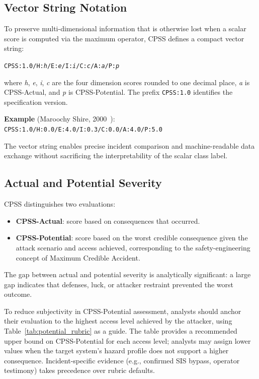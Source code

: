 \documentclass[11pt]{article}
\begin{document}
\subsection{Vector String Notation}

To preserve multi-dimensional information that is otherwise lost
when a scalar score is computed via the maximum operator,
CPSS defines a compact vector string:

\begin{center}
\texttt{CPSS:1.0/H:\textit{h}/E:\textit{e}/I:\textit{i}/C:\textit{c}/A:\textit{a}/P:\textit{p}}
\end{center}

where \textit{h}, \textit{e}, \textit{i}, \textit{c} are the four
dimension scores rounded to one decimal place,
\textit{a} is CPSS-Actual, and \textit{p} is CPSS-Potential.
The prefix \texttt{CPSS:1.0} identifies the specification version.

\noindent\textbf{Example} (Maroochy Shire, 2000~\cite{slay}):
\texttt{CPSS:1.0/H:0.0/E:4.0/I:0.3/C:0.0/A:4.0/P:5.0}

The vector string enables precise incident comparison and
machine-readable data exchange without sacrificing the
interpretability of the scalar class label.

\subsection{Actual and Potential Severity}

CPSS distinguishes two evaluations:

\begin{itemize}
  \item \textbf{CPSS-Actual}: score based on consequences that occurred.
  \item \textbf{CPSS-Potential}: score based on the worst credible
        consequence given the attack scenario and access achieved,
        corresponding to the safety-engineering concept of
        Maximum Credible Accident.
\end{itemize}

The gap between actual and potential severity is analytically
significant: a large gap indicates that defenses, luck, or attacker
restraint prevented the worst outcome.

To reduce subjectivity in CPSS-Potential assessment, analysts should
anchor their evaluation to the highest access level achieved by the
attacker, using Table~\ref{tab:potential_rubric} as a guide.
The table provides a recommended upper bound on CPSS-Potential
for each access level; analysts may assign lower values when
the target system's hazard profile does not support a higher consequence.
Incident-specific evidence (e.g., confirmed SIS bypass, operator
testimony) takes precedence over rubric defaults.
\end{document}
